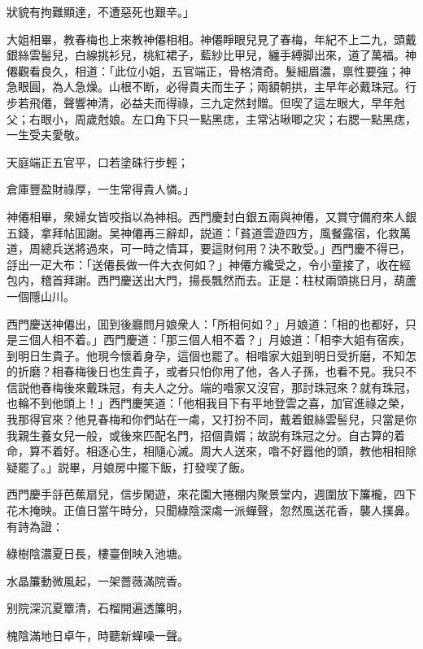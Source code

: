 狀貌有拘難顯達，不遭惡死也艱辛。」

大姐相畢，教春梅也上來教神僊相相。神僊睜眼兒見了春梅，年紀不上二九，頭戴銀絲雲髻兒，白線挑衫兒，桃紅裙子，藍紗比甲兒，纏手縛脚出來，道了萬福。神僊觀看良久，相道：「此位小姐，五官端正，骨格清奇。髮細眉濃，禀性要強；神急眼圓，為人急燥。山根不断，必得貴夫而生子；兩額朝拱，主早年必戴珠冠。行步若飛僊，聲響神清，必益夫而得祿，三九定然封贈。但喫了這左眼大，早年尅父；右眼小，周歲尅娘。左口角下只一點黑痣，主常沾啾唧之灾；右腮一點黑痣，一生受夫愛敬。

天庭端正五官平，口若塗硃行步輕；

倉庫豐盈財祿厚，一生常得貴人憐。」

神僊相畢，衆婦女皆咬指以為神相。西門慶封白銀五兩與神僊，又賞守備府來人銀五錢，拿拜帖囬謝。吴神僊再三辭却，説道：「貧道雲遊四方，風餐露宿，化救萬道，周總兵送將過來，可一時之情耳，要這財何用？決不敢受。」西門慶不得已，㧱出一疋大布：「送僊長做一件大衣何如？」神僊方纔受之，令小童接了，收在經包内，稽首拜謝。西門慶送出大門，揚長飄然而去。正是：柱杖兩頭挑日月，葫蘆一個隱山川。

西門慶送神僊出，囬到後廳問月娘衆人：「所相何如？」月娘道：「相的也都好，只是三個人相不着。」西門慶道：「那三個人相不着？」月娘道：「相李大姐有宿疾，到明日生貴子。他現今懷着身孕，這個也罷了。相喒家大姐到明日受折磨，不知怎的折磨？相春梅後日也生貴子，或者只怕你用了他，各人子孫，也看不見。我只不信説他春梅後來戴珠冠，有夫人之分。端的喒家又沒官，那討珠冠來？就有珠冠，也輪不到他頭上！」西門慶笑道：「他相我目下有平地登雲之喜，加官進祿之榮，我那得官來？他見春梅和你們站在一䖏，又打扮不同，戴着銀絲雲髻兒，只當是你我親生養女兒一般，或後來匹配名門，招個貴婿；故説有珠冠之分。自古算的着命，算不着好。相逐心生，相隨心滅。周大人送來，喒不好囂他的頭，教他相相除疑罷了。」説畢，月娘房中擺下飯，打發喫了飯。

西門慶手㧱芭蕉扇兒，信步閑遊，來花園大捲棚内聚景堂内，週圍放下簾櫳，四下花木掩映。正值日當午時分，只聞綠陰深䖏一派蟬聲，忽然風送花香，襲人撲鼻。有詩為證：

綠樹陰濃夏日長，樓臺倒映入池塘。

水晶簾動微風起，一架薔薇滿院香。

别院深沉夏簟清，石榴開遍透簾明，

槐陰滿地日卓午，時聽新蟬噪一聲。

